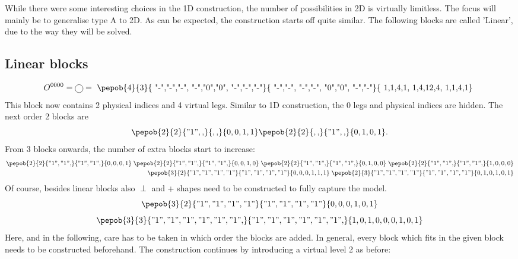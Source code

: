 While there were some interesting choices in the 1D construction, the number of possibilities in 2D is virtually limitless. The focus will mainly be to generalise type A to 2D. As can be expected, the construction starts off quite similar. The following blocks are called 'Linear', due to the way they will be solved.

\subsection{Linear blocks}\label{subsec:lin_block_Def}

\begin{equation}
  O^{0 0 0 0 }= \mpob{1}{ {,}  }{}{}{}{{,,}} = \vcenter{ \hbox{ \pepob{4}{3}{{
            "-","-","-",
            "-","0","0",
            "-","-","-"}}{{
            "-","-",
            "-","-",
            "0","0",
            "-","-"}}{{
            1,1,4,1,
            1,4,12,4,
            1,1,4,1}} }}
\end{equation}
This block now contains 2 physical indices and 4 virtual legs. Similar to 1D construction, the 0 legs and physical indices are hidden. The next order 2 blocks are
\begin{equation}\label{2dblocksorder2}
  \pepob{2}{2}{{"1",,}}{{,,}}{{0,0,1,1}}  \pepob{2}{2}{{,,}}{{"1",,}}{{0,1,0,1}}.
\end{equation}
From 3 blocks onwards, the number of extra blocks start to increase:
\begin{equation}
  \begin{split}
    \pepob{2}{2}{{"1","1",}}{{"1","1",}}{{0,0,0,1}} \;  \pepob{2}{2}{{"1","1",}}{{"1","1",}}{{0,0,1,0}} \; \pepob{2}{2}{{"1","1",}}{{"1","1",}}{{0,1,0,0}} \; \pepob{2}{2}{{"1","1",}}{{"1","1",}}{{1,0,0,0}}\\
    \pepob{3}{2}{{"1","1","1","1"}}{{"1","1","1","1"}}{{0,0,0,1,1,1}} \; \pepob{2}{3}{{"1","1","1","1"}}{{"1","1","1","1"}}{{0,1,0,1,0,1}}
  \end{split}
\end{equation}
Of course, besides linear blocks also $\perp$ and + shapes need to be constructed to fully capture the model.
\begin{equation}
  \pepob{3}{2}{{"1","1","1","1"}}{{"1","1","1","1"}}{{0,0,0,1,0,1}}
\end{equation}
\begin{equation}
  \pepob{3}{3}{{"1","1","1","1","1","1",}}{{"1","1","1","1","1","1",}}{{1,0,1,0,0,0,1,0,1}}
\end{equation}
Here, and in the following, care has to be taken in which order the blocks are added. In general, every block which fits in the given block needs to be constructed beforehand. The construction continues by introducing a virtual level 2 as before:
